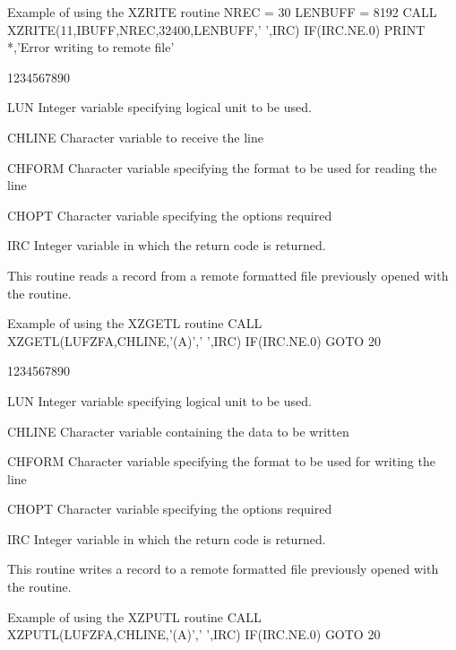 \begin{XMPt}{Example of using the XZRITE routine}
      NREC    = 30
      LENBUFF = 8192
      CALL XZRITE(11,IBUFF,NREC,32400,LENBUFF,' ',IRC)
      IF(IRC.NE.0) PRINT *,'Error writing to remote file'
\end{XMPt}
\begin{DLtt}{1234567890}
\item[LUN]Integer variable specifying logical unit to be used.
\item[CHLINE]Character variable to receive the line
\item[CHFORM]Character variable specifying the format to
be used for reading the line
\item[CHOPT]Character variable specifying the options required
\item[IRC]Integer variable in which the return code is returned.
\end{DLtt}
This routine reads a record from a remote formatted
file previously opened with the  routine.
\begin{XMPt}{Example of using the XZGETL routine}
         CALL XZGETL(LUFZFA,CHLINE,'(A)',' ',IRC)
         IF(IRC.NE.0) GOTO 20
\end{XMPt}
\begin{DLtt}{1234567890}
\item[LUN]Integer variable specifying logical unit to be used.
\item[CHLINE]Character variable containing the data to be written
\item[CHFORM]Character variable specifying the format to
be used for writing the line
\item[CHOPT]Character variable specifying the options required
\item[IRC]Integer variable in which the return code is returned.
\end{DLtt}
This routine writes a record to a remote formatted
file previously opened with the  routine.
\begin{XMPt}{Example of using the XZPUTL routine}
         CALL XZPUTL(LUFZFA,CHLINE,'(A)',' ',IRC)
         IF(IRC.NE.0) GOTO 20
\end{XMPt}

